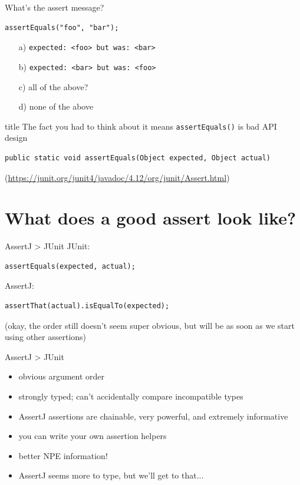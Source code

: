 \documentclass[xetex,12pt,aspectratio=169]{beamer}
\begin{document}
\begin{frame}[fragile]{What's the assert message?}
\begin{verbatim}
assertEquals("foo", "bar");
\end{verbatim}
\vfill
\begin{itemize}[<+(1)->]
\item[a)] \texttt{expected: <foo> but was: <bar>}
\item[b)] \texttt{expected: <bar> but was: <foo>}
\item[c)] all of the above?
\item[d)] none of the above
\end{itemize}
\end{frame}

\begin{frame}[fragile]
\vfill
\begin{beamercolorbox}[sep=8pt,center,shadow=false,rounded=false]{title}
The fact you had to think about it means \texttt{assertEquals()} is bad API design\par%
\end{beamercolorbox}
\vfill
\pause
\begin{verbatim}
public static void assertEquals(Object expected, Object actual)
\end{verbatim}
({\footnotesize\url{https://junit.org/junit4/javadoc/4.12/org/junit/Assert.html}})
\end{frame}

\section{What does a good assert look like?}

\begin{frame}[fragile]{AssertJ > JUnit}
JUnit:
\begin{verbatim}
assertEquals(expected, actual);
\end{verbatim}
\vfill
AssertJ:
\begin{verbatim}
assertThat(actual).isEqualTo(expected);
\end{verbatim}
\vfill
(okay, the order still doesn't seem super obvious, but will be as soon as we start using other assertions)
\end{frame}

\begin{frame}{AssertJ > JUnit}
\begin{itemize}
\item obvious argument order
\item strongly typed; can't accidentally compare incompatible types
\item AssertJ assertions are chainable, very powerful, and extremely informative
\item you can write your own assertion helpers
\item better NPE information!
\item AssertJ seems more to type, but we'll get to that...
\end{itemize}
\end{frame}
\end{document}
